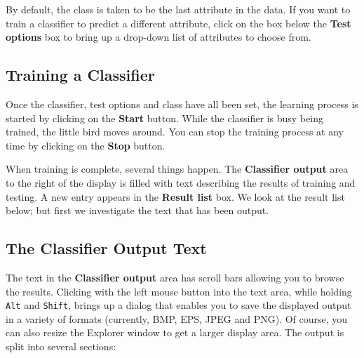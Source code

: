 \documentclass[a4paper]{article}
\begin{document}
By default, the class is taken to be the last attribute in the data.  If you
want to train a classifier to predict a different attribute, click on the box
below the \textbf{Test options} box to bring up a drop-down list of attributes
to choose from.

\subsection{Training a Classifier}

Once the classifier, test options and class have all been set, the learning
process is started by clicking on the \textbf{Start} button. While the
classifier is busy being trained, the little bird moves around. You can stop
the training process at any time by clicking on the \textbf{Stop} button.

When training is complete, several things happen. The \textbf{Classifier
output} area to the right of the display is filled with text describing the
results of training and testing. A new entry appears in the \textbf{Result
list} box. We look at the result list below; but first we investigate the text
that has been output.

\subsection{The Classifier Output Text}

The text in the \textbf{Classifier output} area has scroll bars allowing you to
browse the results. Clicking with the left mouse button into the text area, 
while holding \texttt{Alt} and \texttt{Shift}, brings up a dialog that enables 
you to save the displayed output in a variety of formats (currently, BMP, EPS, JPEG and PNG). 
Of course, you can also resize the Explorer window to get a larger display area.  
The output is split into several sections:
\end{document}

